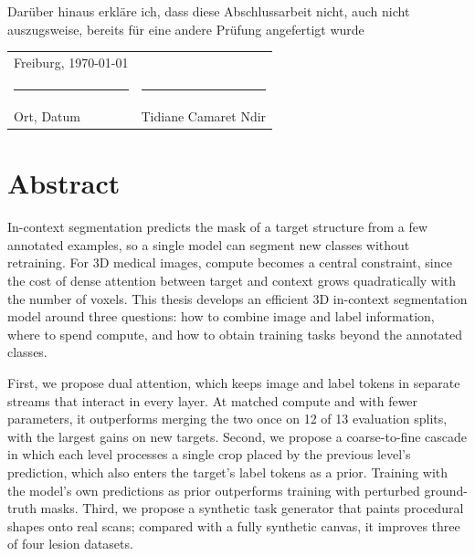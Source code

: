 \documentclass[hidelinks, a4paper, 12pt, ngerman, english]{article}  %
\begin{document}
Darüber hinaus erkläre ich, dass diese Abschlussarbeit nicht, auch nicht
auszugsweise, bereits für eine andere Prüfung angefertigt wurde

\bigskip
\bigskip
\bigskip
\bigskip
\bigskip
\bigskip

\begin{tabular}{p{} l}
    Freiburg, \today             &                              \\
    \rule{\textwidth*2/5}{0.4pt} & \rule{\textwidth*2/5}{0.4pt} \\
    Ort, Datum                   & Tidiane Camaret Ndir
\end{tabular}

\endgroup
\section*{}\label{sec:acknowledgements}


\section*{Abstract}

In-context segmentation predicts the mask of a target structure from a few
annotated examples, so a single model can segment new classes without
retraining. For 3D medical images, compute becomes a central constraint,
since the cost of dense attention between target and context grows
quadratically with the number of voxels. This thesis develops an efficient 3D
in-context segmentation model around three questions: how to combine image
and label information, where to spend compute, and how to obtain training
tasks beyond the annotated classes.

First, we propose dual attention, which keeps image and label tokens in
separate streams that interact in every layer. At matched compute and with
fewer parameters, it outperforms merging the two once on 12 of 13 evaluation
splits, with the largest gains on new targets. Second, we propose a
coarse-to-fine cascade in which each level processes a single crop placed by
the previous level's prediction, which also enters the target's label tokens
as a prior. Training with the model's own predictions as prior outperforms
training with perturbed ground-truth masks. Third, we propose a synthetic
task generator that paints procedural shapes onto real scans; compared with a
fully synthetic canvas, it improves three of four lesion datasets.
\end{document}
